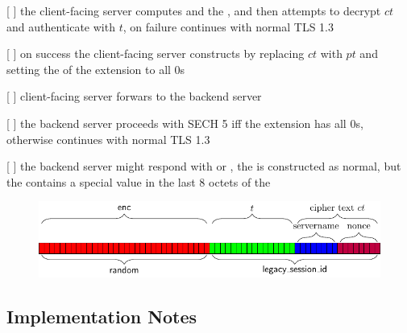 [ ] the client-facing server computes  and the \nonce, and then attempts to decrypt $ct$ and authenticate with $t$, on failure continues with normal TLS 1.3

[ ] on success the client-facing server constructs  by replacing $ct$ with $pt$ and setting the  of the  extension to all 0s

[ ] client-facing server forwars  to the backend server

[ ] the backend server proceeds with SECH 5 iff the  extension has all 0s, otherwise continues with normal TLS 1.3

[ ] the backend server might respond with  or , the  is constructed as normal, but the  contains a special  value in the last 8 octets of the 


\begin{figure}[htb]
\centering
\includegraphics[width=\linewidth]{figure/sech5-cover.pdf}
\captionsetup{width=.8\linewidth} 
\caption[SECH 5 Cover]{}
\label{fig:sech5-cover}
\end{figure}

\subsection{Implementation Notes}